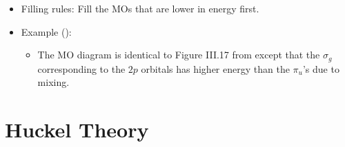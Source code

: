 \documentclass[../notes.tex]{subfiles}
\begin{document}
\begin{itemize}
\begin{itemize}
    \end{itemize}
    \item Filling rules: Fill the MOs that are lower in energy first.
    \item Example ():
    \begin{itemize}
        \item The MO diagram is identical to Figure III.17 from \textcite{bib:IChemNotes} except that the $\sigma_g$ corresponding to the $2p$ orbitals has higher energy than the $\pi_u$'s due to mixing.
    \end{itemize}
\end{itemize}



\section{Huckel Theory}
\end{document}
